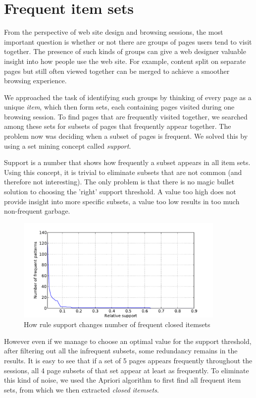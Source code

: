 \documentclass[12pt, english,a4paper]{article}
\begin{document}
\section{Frequent item sets} 
From the perspective of web site design and browsing sessions, the most important question is whether or not there are groups of pages users tend to visit together. The presence of such kinds of groups can give a web designer valuable insight into how people use the web site. For example, content split on separate pages but still often viewed together can be merged to achieve a smoother browsing experience.

We approached the task of identifying such groups by thinking of every page as a unique \emph{item}, which then form sets, each containing pages visited during one browsing session. To find pages that are frequently visited together, we searched among these sets for subsets of pages that frequently appear together. The problem now was deciding when a subset of pages is frequent. We solved this by using a set mining \cite{frequent_item_set_mining} concept called \emph{support}.

Support is a number that shows how frequently a subset appears in all item sets. Using this concept, it is trivial to eliminate subsets that are not common (and therefore not interesting). The only problem is that there is no magic bullet solution to choosing the 'right' support threshold. A value too high does not provide insight into more specific subsets, a value too low results in too much non-frequent garbage.
\begin{figure}[H]
  \centering
      \includegraphics[width=0.9\textwidth]{apriori_closed_itemset_count}
  \caption{How rule support changes number of frequent closed itemsets}
\end{figure}


However even if we manage to choose an optimal value for the support threshold, after filtering out all the infrequent subsets, some redundancy remains in the results. It is easy to see that if a set of 5 pages appears frequently throughout the sessions, all 4 page subsets of that set appear at least as frequently. To eliminate this kind of noise, we used the Apriori algorithm \cite{apriori} to first find all frequent item sets, from which we then extracted \emph{closed itemsets}.
\end{document}
